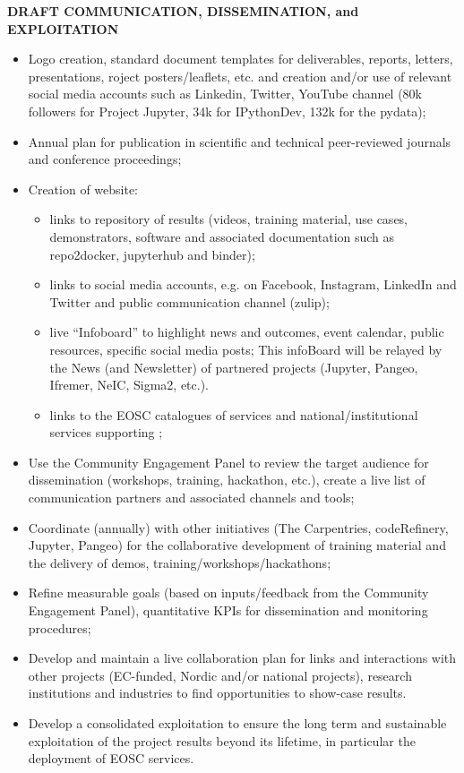 \begin{framed}

  \centerline{\textbf{ \TheProject DRAFT COMMUNICATION, DISSEMINATION, and EXPLOITATION}}
  {
  \begin{itemize}

\item Logo creation, standard document templates for deliverables, reports, letters, presentations, roject posters/leaflets, etc. and creation and/or use of relevant social media accounts such as Linkedin, Twitter, YouTube channel (80k followers for Project Jupyter, 34k for IPythonDev, 132k for the pydata);
\item Annual plan for publication in scientific and technical peer-reviewed journals and conference proceedings;
\item Creation of \TheProject website:
\begin{itemize}
\item links to \TheProject repository of results (videos, training material, use cases, demonstrators, software and associated documentation such as repo2docker, jupyterhub and binder);
\item links to social media accounts, e.g. on Facebook, Instagram, LinkedIn and Twitter and public communication channel (zulip);
\item live “Infoboard” to highlight news and outcomes, event calendar, public resources, specific social media posts; This infoBoard will be relayed by the News (and Newsletter) of partnered projects (Jupyter, Pangeo, Ifremer, NeIC, Sigma2, etc.).
\item links to the EOSC catalogues of services and national/institutional services supporting \TheProject;
\end{itemize}
\item Use the Community Engagement Panel to review the target audience for dissemination (workshops, training, hackathon, etc.), create a live list of communication partners and associated channels and tools;
\item Coordinate (annually) with other initiatives (The Carpentries, codeRefinery, Jupyter, Pangeo) for the collaborative development of training material and the delivery of demos, training/workshops/hackathons;
\item Refine measurable goals (based on inputs/feedback from the Community
  Engagement Panel), quantitative KPIs for dissemination and monitoring procedures;
\item Develop and maintain a live collaboration plan for links and interactions with other projects (EC-funded, Nordic and/or national projects), research institutions and industries to find opportunities to show-case \TheProject results.
\item Develop a consolidated exploitation to ensure the long term and sustainable exploitation of the project results beyond its lifetime, in particular the deployment of EOSC services.
    \end{itemize}
}
\end{framed}

